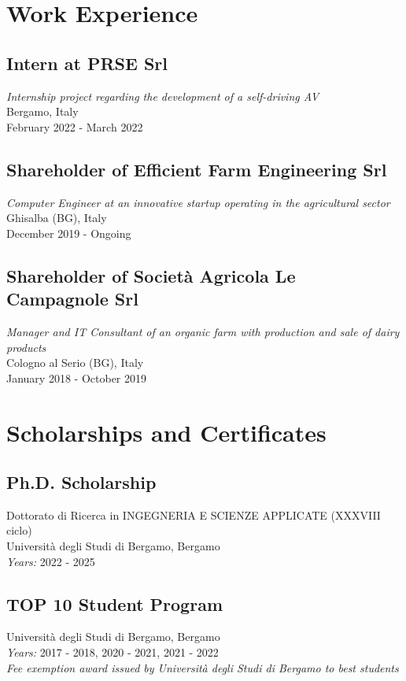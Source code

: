 \documentclass[11pt]{article}
\begin{document}
\bigskip
\section*{Work Experience}
\subsection*{Intern at PRSE Srl}
\textit{Internship project regarding the development of a self-driving AV}\\
Bergamo, Italy\\
February 2022 - March 2022

\subsection*{Shareholder of Efficient Farm Engineering Srl}
\textit{Computer Engineer at an innovative startup operating in the agricultural sector}\\
Ghisalba (BG), Italy\\
December 2019 - Ongoing

\subsection*{Shareholder of Società Agricola Le Campagnole Srl}
\textit{Manager and IT Consultant of an organic farm with production and sale of dairy products}\\
Cologno al Serio (BG), Italy\\
January 2018 - October 2019

\bigskip
\section*{Scholarships and Certificates}
\subsection*{Ph.D. Scholarship}
Dottorato di Ricerca in INGEGNERIA E SCIENZE APPLICATE (XXXVIII ciclo)\\
Università degli Studi di Bergamo, Bergamo\\
\textit{Years:} 2022 - 2025\\
\subsection*{TOP 10 Student Program}
Università degli Studi di Bergamo, Bergamo\\
\textit{Years:} 2017 - 2018, 2020 - 2021, 2021 - 2022\\
\textit{Fee exemption award issued by Università degli Studi di Bergamo to best students}
\end{document}
